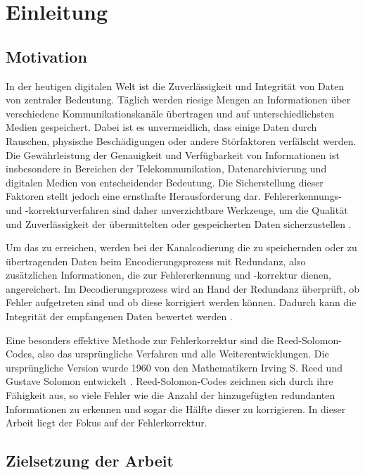 \chapter{Einleitung}\label{ch:intro}

\section{Motivation}\label{sec:motivation}

In der heutigen digitalen Welt ist die Zuverlässigkeit und Integrität von Daten von zentraler Bedeutung. 
Täglich werden riesige Mengen an Informationen über verschiedene Kommunika\-tions\-kanäle übertragen und auf unterschiedlichsten Medien gespeichert. 
Dabei ist es unvermeidlich, dass einige Daten durch Rauschen, physische Beschädigungen oder andere Störfaktoren verfälscht werden. 
Die Gewährleistung der Genauigkeit und Verfügbarkeit von Informationen ist insbesondere in Bereichen der Telekommunikation, Datenarchivierung und digitalen Medien von entscheidender Bedeutung. 
Die Sicherstellung dieser Faktoren stellt jedoch eine ernsthafte Herausforderung  dar. 
Fehlererkennungs- und -korrekturverfahren sind daher unverzichtbare Werkzeuge, um die Qualität und Zuverlässigkeit der übermittelten oder gespeicherten Daten sicherzustellen \cite{petersonErrorcorrectingCodes1972}.

Um das zu erreichen, werden bei der Kanalcodierung die zu speichernden oder zu übertragenden Daten beim Encodierungsprozess mit Redundanz, also zusätzlichen Informationen, die zur Fehlererkennung und -korrektur dienen, angereichert. 
Im Decodierungsprozess wird an Hand der Redundanz überprüft, ob Fehler aufgetreten sind und ob diese korrigiert werden können. 
Dadurch kann die Integrität der empfangenen Daten bewertet werden \cite{friedrichsKanalcodierung1996}.

Eine besonders effektive Methode zur Fehlerkorrektur sind die Reed-Solomon-Codes, also das ursprüngliche Verfahren und alle Weiterentwicklungen.
Die ursprüngliche Version wurde 1960 von den Mathematikern Irving S. Reed und Gustave Solomon entwickelt \cite{reedPolynomialCodesCertain1960}. 
Reed-Solomon-Codes zeichnen sich durch ihre Fähigkeit aus, so viele Fehler wie die Anzahl der hinzugefügten redundanten Informationen zu erkennen und sogar die Hälfte dieser zu korrigieren.
In dieser Arbeit liegt der Fokus auf der Fehlerkorrektur.

\section{Zielsetzung der Arbeit}\label{sec:objective}

